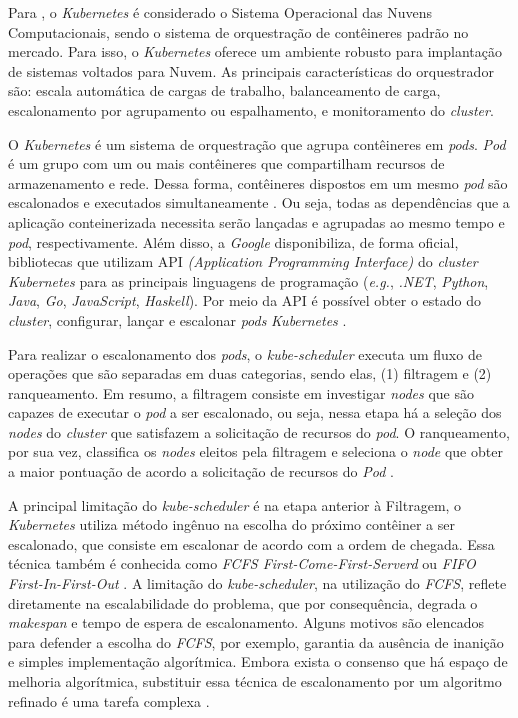 Para , o \textit{Kubernetes} é considerado o Sistema Operacional das Nuvens Computacionais, sendo o sistema de orquestração de contêineres padrão no mercado. Para isso, o \textit{Kubernetes} oferece um ambiente robusto para implantação de sistemas voltados para Nuvem. As principais características do orquestrador são: escala automática de cargas de trabalho, balanceamento de carga, escalonamento por agrupamento ou espalhamento, e monitoramento do \textit{cluster}.

O \textit{Kubernetes} é um sistema de orquestração que agrupa contêineres em \textit{pods}. \textit{Pod} é um grupo com um ou mais contêineres que compartilham recursos de armazenamento e rede. Dessa forma, contêineres dispostos em um mesmo \textit{pod} são escalonados e executados simultaneamente \cite{Google}. Ou seja, todas as dependências que a aplicação conteinerizada necessita serão lançadas e agrupadas ao mesmo tempo e \textit{pod}, respectivamente. Além disso, a \textit{Google} disponibiliza, de forma oficial, bibliotecas que utilizam API \textit{(Application Programming Interface)} do \textit{cluster} \textit{Kubernetes}  para as principais linguagens de programação (\textit{e.g.}, \textit{.NET}, \textit{Python}, \textit{Java}, \textit{Go}, \textit{JavaScript}, \textit{Haskell}). Por meio da API é possível obter o estado do \textit{cluster}, configurar, lançar e escalonar \textit{pods} \textit{Kubernetes} \cite{KubernetesAPI}.

Para realizar o escalonamento dos \textit{pods}, o \textit{kube-scheduler} executa um fluxo de operações que são separadas em duas categorias, sendo elas, (1) filtragem e (2) ranqueamento. Em resumo, a filtragem consiste em investigar \textit{nodes} que são capazes de executar o \textit{pod} a ser escalonado, ou seja, nessa etapa há a seleção dos \textit{nodes} do \textit{cluster} que satisfazem a solicitação de recursos do \textit{pod}. O ranqueamento, por sua vez, classifica os \textit{nodes} eleitos pela filtragem e seleciona o \textit{node} que obter a maior pontuação de acordo a solicitação de recursos do \textit{Pod} \cite{Kubescheduler}.

A principal limitação do \textit{kube-scheduler} é na etapa anterior à Filtragem, o \textit{Kubernetes} utiliza método ingênuo na escolha do próximo contêiner a ser escalonado, que consiste em escalonar de acordo com a ordem de chegada. Essa técnica também é conhecida como \textit{FCFS First-Come-First-Serverd} ou \textit{FIFO First-In-First-Out} \cite{Ye2007}. A limitação do \textit{kube-scheduler}, na utilização do \textit{FCFS}, reflete diretamente na escalabilidade do problema, que por consequência, degrada o \textit{makespan} e tempo de espera de escalonamento. Alguns motivos são elencados para defender a escolha do \textit{FCFS}, por exemplo, garantia da ausência de inanição e simples implementação algorítmica. Embora exista o consenso que há espaço de melhoria algorítmica, substituir essa técnica de escalonamento por um algoritmo refinado é uma tarefa complexa \cite{CarastanSantos2019}.

